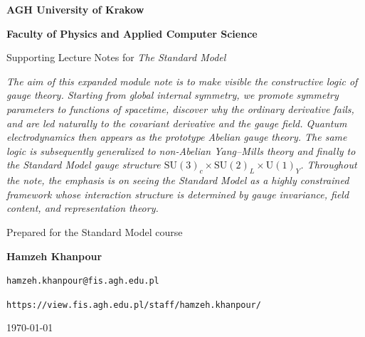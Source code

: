 \documentclass[11pt,a4paper]{article}
\newcommand{\SMgauge}{\mathrm{SU}(3)_c \times \mathrm{SU}(2)_L \times \mathrm{U}(1)_Y}
\begin{document}
\begin{titlepage}
\centering
\vspace*{1.2cm}
{\textbf{AGH University of Krakow}\par}
{\textbf{Faculty of Physics and Applied Computer Science}\par}
\vspace{1.4cm}


\vspace{1.3cm}
{\Large Supporting Lecture Notes for \textit{The Standard Model}\par}
\vspace{0.35cm}
\vspace{1.2cm}




\begin{guidelinebox}
\vspace{0.25cm}
\itshape
The aim of this expanded module note is to make visible the constructive logic of gauge theory. Starting from global internal symmetry, we promote symmetry parameters to functions of spacetime, discover why the ordinary derivative fails, and are led naturally to the covariant derivative and the gauge field. Quantum electrodynamics then appears as the prototype Abelian gauge theory. The same logic is subsequently generalized to non-Abelian Yang--Mills theory and finally to the Standard Model gauge structure {\color{red}\(\SMgauge\)}. Throughout the note, the emphasis is on seeing the Standard Model as a highly constrained framework whose interaction structure is determined by gauge invariance, field content, and representation theory.
\end{guidelinebox}



\vfill
{\normalsize Prepared for the Standard Model course\par}
{\textbf{Hamzeh Khanpour}\par}
{\normalsize \texttt{hamzeh.khanpour@fis.agh.edu.pl}\par}
{\texttt{https://view.fis.agh.edu.pl/staff/hamzeh.khanpour/}\par}
{\normalsize \today\par} %

\end{titlepage}
\end{document}
